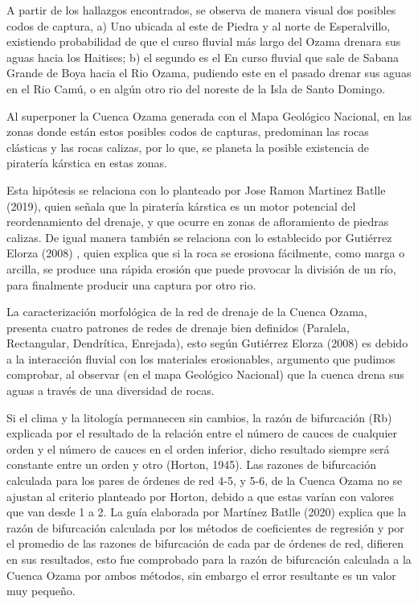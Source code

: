 \documentclass[11pt,]{article}
\begin{document}
A partir de los hallazgos encontrados, se observa de manera visual dos
posibles codos de captura, a) Uno ubicada al este de Piedra y al norte
de Esperalvillo, existiendo probabilidad de que el curso fluvial más
largo del Ozama drenara sus aguas hacia los Haitises; b) el segundo es
el En curso fluvial que sale de Sabana Grande de Boya hacia el Rio
Ozama, pudiendo este en el pasado drenar sus aguas en el Rio Camú, o en
algún otro rio del noreste de la Isla de Santo Domingo.

Al superponer la Cuenca Ozama generada con el Mapa Geológico Nacional,
en las zonas donde están estos posibles codos de capturas, predominan
las rocas clásticas y las rocas calizas, por lo que, se planeta la
posible existencia de piratería kárstica en estas zonas.

Esta hipótesis se relaciona con lo planteado por Jose Ramon Martinez
Batlle (2019), quien señala que la piratería kárstica es un motor
potencial del reordenamiento del drenaje, y que ocurre en zonas de
afloramiento de piedras calizas. De igual manera también se relaciona
con lo establecido por Gutiérrez Elorza (2008) , quien explica que si la
roca se erosiona fácilmente, como marga o arcilla, se produce una rápida
erosión que puede provocar la división de un río, para finalmente
producir una captura por otro rio.

La caracterización morfológica de la red de drenaje de la Cuenca Ozama,
presenta cuatro patrones de redes de drenaje bien definidos (Paralela,
Rectangular, Dendrítica, Enrejada), esto según Gutiérrez Elorza (2008)
es debido a la interacción fluvial con los materiales erosionables,
argumento que pudimos comprobar, al observar (en el mapa Geológico
Nacional) que la cuenca drena sus aguas a través de una diversidad de
rocas.

Si el clima y la litología permanecen sin cambios, la razón de
bifurcación (Rb) explicada por el resultado de la relación entre el
número de cauces de cualquier orden y el número de cauces en el orden
inferior, dicho resultado siempre será constante entre un orden y otro
(Horton, 1945). Las razones de bifurcación calculada para los pares de
órdenes de red 4-5, y 5-6, de la Cuenca Ozama no se ajustan al criterio
planteado por Horton, debido a que estas varían con valores que van
desde 1 a 2. La guía elaborada por Martínez Batlle (2020) explica que la
razón de bifurcación calculada por los métodos de coeficientes de
regresión y por el promedio de las razones de bifurcación de cada par de
órdenes de red, difieren en sus resultados, esto fue comprobado para la
razón de bifurcación calculada a la Cuenca Ozama por ambos métodos, sin
embargo el error resultante es un valor muy pequeño.
\end{document}
